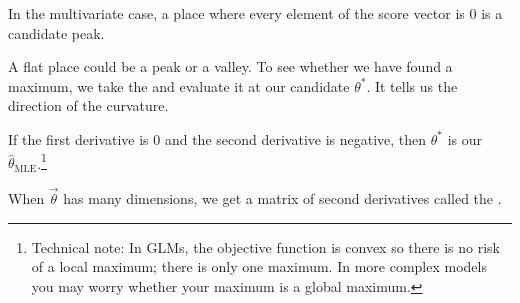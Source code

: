 \documentclass[11pt]{article}
\newcommand{\bgreen}[1]{\textbf{\color{olive}{#1}}}
\begin{document}
In the multivariate case, a place where every element of the score vector is 0 is a candidate peak.

A flat place could be a peak or a valley. To see whether we have found a maximum, we take the \bgreen{second derivative} and evaluate it at our candidate $\theta^*$. It tells us the direction of the curvature.

\begin{center}
\end{center}

If the first derivative is 0 and the second derivative is negative, then $\theta^*$ is our \bgreen{maximum likelihood estimate} $\hat\theta_\text{MLE}$.\footnote{Technical note: In GLMs, the objective function is convex so there is no risk of a local maximum; there is only one maximum. In more complex models you may worry whether your maximum is a global maximum.}

When $\vec\theta$ has many dimensions, we get a matrix of second derivatives called the \bgreen{Hessian}.
\end{document}
